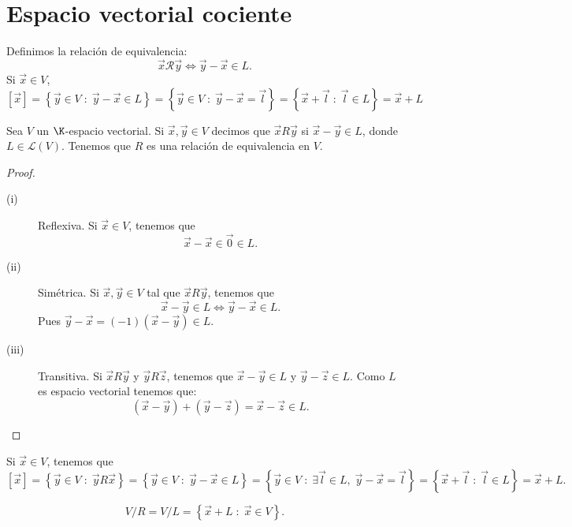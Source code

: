\section{Espacio vectorial cociente}

\begin{fdefinition}[]
\normalfont Definimos la relación de equivalencia:
\[\vec{x} \mathcal{R} \vec{y} \iff \vec{y}-\vec{x} \in L .\]
Si $\displaystyle \vec{x}\in V $,
\[\displaystyle \left[\vec{x}\right] = \left\{ \vec{y} \in V \; : \; \vec{y}-\vec{x} \in L\right\} = \left\{ \vec{y} \in V \; : \; \vec{y}-\vec{x} = \vec{l}\right\}  = \left\{ \vec{x} + \vec{l} \; : \; \vec{l}\in L\right\}  = \vec{x} + L  \]
\end{fdefinition}

\begin{ftheorem}[]
\normalfont Sea $\displaystyle V $ un $\displaystyle \K $-espacio vectorial. Si $\displaystyle \vec{x}, \vec{y} \in V $ decimos que $\displaystyle \vec{x} R \vec{y} $ si $\displaystyle \vec{x} - \vec{y} \in L $, donde $\displaystyle L \in \mathcal{L}\left(V\right) $. Tenemos que $\displaystyle R $ es una relación de equivalencia en $\displaystyle V $.
\end{ftheorem}

\begin{proof}
\begin{description}
\item[(i)] Reflexiva. Si $\displaystyle \vec{x} \in V $, tenemos que 
	\[\vec{x}-\vec{x} \in \vec{0} \in L .\]
\item[(ii)] Simétrica. Si $\displaystyle \vec{x}, \vec{y} \in V $ tal que $\displaystyle \vec{x} R \vec{y} $, tenemos que 
	\[\vec{x} - \vec{y} \in L \iff \vec{y} - \vec{x} \in L .\]
Pues $\displaystyle \vec{y}-\vec{x} = \left(-1\right)\left(\vec{x}-\vec{y}\right) \in L $. 
\item[(iii)] Transitiva. Si $\displaystyle \vec{x} R \vec{y} $ y $\displaystyle \vec{y} R \vec{z} $, tenemos que $\displaystyle \vec{x}-\vec{y} \in L $ y $\displaystyle \vec{y}-\vec{z} \in L $. Como $\displaystyle L $ es espacio vectorial tenemos que:
	\[\left(\vec{x}-\vec{y}\right)+\left(\vec{y}-\vec{z}\right) = \vec{x}-\vec{z} \in L .\]
\end{description}
\end{proof}

Si $\displaystyle \vec{x} \in V $, tenemos que 
\[ \left[\vec{x}\right]  = \left\{ \vec{y} \in V \; : \; \vec{y}R\vec{x}\right\} = \left\{ \vec{y}\in V\; : \; \vec{y}-\vec{x} \in L\right\} = \left\{ \vec{y} \in V \; : \; \exists \vec{l}\in L, \; \vec{y}-\vec{x} = \vec{l}\right\} = \left\{ \vec{x}+\vec{l} \; : \; \vec{l}\in L\right\} = \vec{x} + L  .\]
\begin{fdefinition}
\normalfont 
\[V / R = V / L = \left\{ \vec{x} + L \; : \; \vec{x} \in V\right\}  .\]
\end{fdefinition}

